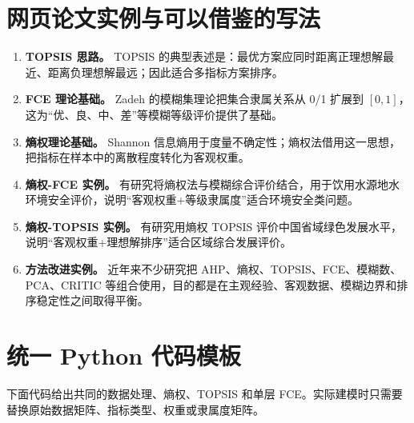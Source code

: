 \documentclass[UTF8,zihao=-4]{ctexart}
\begin{document}
\section{网页论文实例与可以借鉴的写法}
\begin{enumerate}
  \item \textbf{TOPSIS 思路。} TOPSIS 的典型表述是：最优方案应同时距离正理想解最近、距离负理想解最远；因此适合多指标方案排序。
  \item \textbf{FCE 理论基础。} Zadeh 的模糊集理论把集合隶属关系从 0/1 扩展到 $[0,1]$，这为“优、良、中、差”等模糊等级评价提供了基础。
  \item \textbf{熵权理论基础。} Shannon 信息熵用于度量不确定性；熵权法借用这一思想，把指标在样本中的离散程度转化为客观权重。
  \item \textbf{熵权-FCE 实例。} 有研究将熵权法与模糊综合评价结合，用于饮用水源地水环境安全评价，说明“客观权重+等级隶属度”适合环境安全类问题。
  \item \textbf{熵权-TOPSIS 实例。} 有研究用熵权 TOPSIS 评价中国省域绿色发展水平，说明“客观权重+理想解排序”适合区域综合发展评价。
  \item \textbf{方法改进实例。} 近年来不少研究把 AHP、熵权、TOPSIS、FCE、模糊数、PCA、CRITIC 等组合使用，目的都是在主观经验、客观数据、模糊边界和排序稳定性之间取得平衡。
\end{enumerate}

\section{统一 Python 代码模板}
下面代码给出共同的数据处理、熵权、TOPSIS 和单层 FCE。实际建模时只需要替换原始数据矩阵、指标类型、权重或隶属度矩阵。
\end{document}
